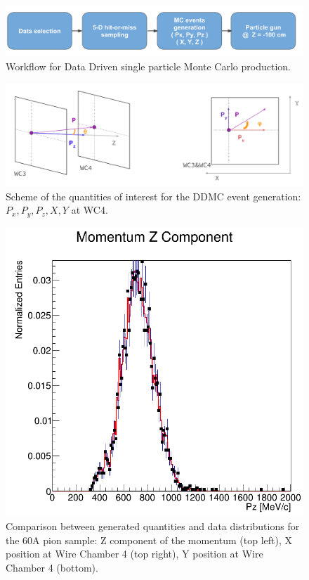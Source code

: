 \begin{figure}[hpbt]
\centering
\includegraphics[width=\textwidth]{Chapter-5/Images/DDMCScheme.png}
\caption{Workflow for Data Driven single particle Monte Carlo production.}
\label{fig:DDMCSketch}
\end{figure}


\begin{figure}[hpbt]
\centering
\includegraphics[width=\textwidth]{Chapter-5/Images/DDMCQuantities.png}
\caption{Scheme of the quantities of interest for the DDMC event generation: $P_x, P_y, P_z, X, Y$ at WC4.}
\label{fig:DDMCQuantities}
\end{figure}


\begin{figure}[hpbt]
\centering
\includegraphics[width=\textwidth]{Chapter-5/Images/Pz.png}
\caption{Comparison between generated quantities and data distributions for the 60A pion sample: Z component of the momentum (top left), X position at Wire Chamber 4 (top right), Y position at Wire Chamber 4 (bottom).}
\label{fig:DDMCComparison}
\end{figure}



